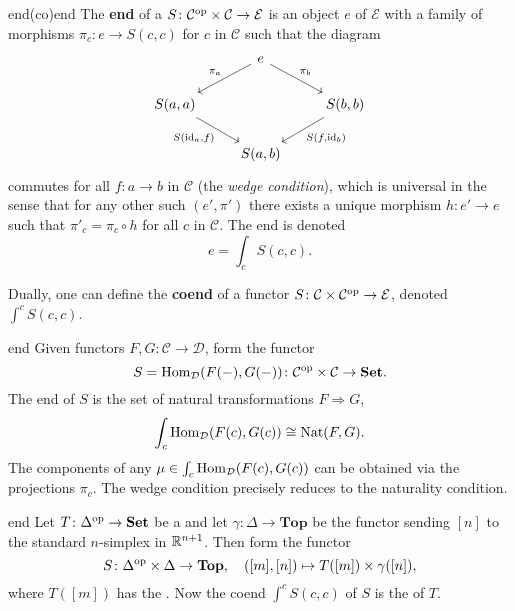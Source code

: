 \begin{topic}{end}{(co)end}
    The \textbf{end} of a  $S \colon \mathcal{C}^\textup{op} \times \mathcal{C} \to \mathcal{E}$ is an object $e$ of $\mathcal{E}$ with a family of morphisms $\pi_c \colon e \to S(c, c)$ for $c$ in $\mathcal{C}$ such that the diagram
    \[ \svg \begin{tikzcd} & e \arrow[swap]{ld}{\pi_a} \arrow{dr}{\pi_b} & \\ S(a, a) \arrow[swap]{dr}{S(\id_a, f)} && S(b, b) \arrow{ld}{S(f, \id_b)} \\ & S(a, b) & \end{tikzcd} \]
    commutes for all $f \colon a \to b$ in $\mathcal{C}$ (the \textit{wedge condition}), which is universal in the sense that for any other such $(e', \pi')$ there exists a unique morphism $h \colon e' \to e$ such that $\pi'_c = \pi_c \circ h$ for all $c$ in $\mathcal{C}$. The end is denoted
    \[ e = \int_c S(c, c) . \]
    
    Dually, one can define the \textbf{coend} of a functor $S \colon \mathcal{C} \times \mathcal{C}^\textup{op} \to \mathcal{E}$, denoted $\int^c S(c, c)$.
\end{topic}

\begin{example}{end}
    Given functors $F, G \colon \mathcal{C} \to \mathcal{D}$, form the functor
    \[ S = \operatorname{Hom}_\mathcal{D}(F(-), G(-)) \colon \mathcal{C}^\textup{op} \times \mathcal{C} \to \textbf{Set} . \]
    The end of $S$ is the set of natural transformations $F \Rightarrow G$,
    \[ \int_c \operatorname{Hom}_\mathcal{D}(F(c), G(c)) \cong \textup{Nat}(F, G) . \]
    The components of any $\mu \in \int_c \operatorname{Hom}_\mathcal{D}(F(c), G(c))$ can be obtained via the projections $\pi_c$. The wedge condition precisely reduces to the naturality condition.
\end{example}

\begin{example}{end}
    Let $T \colon \Delta^\textup{op} \to \textbf{Set}$ be a  and let $\gamma \colon \Delta \to \textbf{Top}$ be the functor sending $[n]$ to the standard $n$-simplex in $\mathbb{R}^{n + 1}$. Then form the functor
    \[ S \colon \Delta^\textup{op} \times \Delta \to \textbf{Top}, \quad ([m], [n]) \mapsto T([m]) \times \gamma([n]) , \]
    where $T([m])$ has the . Now the coend $\int^c S(c, c)$ of $S$ is the  of $T$.
\end{example}

